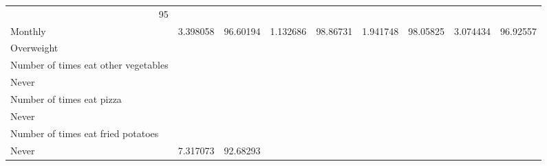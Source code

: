 \documentclass{article}
\begin{document}
\begin{tabular}{lllllllll}
  \multicolumn{1}{r}{95} \\
\multicolumn{1}{l}{\hspace{7em}Monthly} &
  \multicolumn{1}{|r}{3.398058} &
  \multicolumn{1}{r}{96.60194} &
  \multicolumn{1}{r}{1.132686} &
  \multicolumn{1}{r}{98.86731} &
  \multicolumn{1}{r}{1.941748} &
  \multicolumn{1}{r}{98.05825} &
  \multicolumn{1}{r}{3.074434} &
  \multicolumn{1}{r}{96.92557} \\
\multicolumn{1}{l}{\hspace{1em}Overweight} &
  \multicolumn{1}{|r}{} &
  \multicolumn{1}{r}{} &
  \multicolumn{1}{r}{} &
  \multicolumn{1}{r}{} &
  \multicolumn{1}{r}{} &
  \multicolumn{1}{r}{} &
  \multicolumn{1}{r}{} &
  \multicolumn{1}{r}{} \\
\multicolumn{1}{l}{\hspace{2em}Number of times eat other vegetables} &
  \multicolumn{1}{|r}{} &
  \multicolumn{1}{r}{} &
  \multicolumn{1}{r}{} &
  \multicolumn{1}{r}{} &
  \multicolumn{1}{r}{} &
  \multicolumn{1}{r}{} &
  \multicolumn{1}{r}{} &
  \multicolumn{1}{r}{} \\
\multicolumn{1}{l}{\hspace{3em}Never} &
  \multicolumn{1}{|r}{} &
  \multicolumn{1}{r}{} &
  \multicolumn{1}{r}{} &
  \multicolumn{1}{r}{} &
  \multicolumn{1}{r}{} &
  \multicolumn{1}{r}{} &
  \multicolumn{1}{r}{} &
  \multicolumn{1}{r}{} \\
\multicolumn{1}{l}{\hspace{4em}Number of times eat pizza} &
  \multicolumn{1}{|r}{} &
  \multicolumn{1}{r}{} &
  \multicolumn{1}{r}{} &
  \multicolumn{1}{r}{} &
  \multicolumn{1}{r}{} &
  \multicolumn{1}{r}{} &
  \multicolumn{1}{r}{} &
  \multicolumn{1}{r}{} \\
\multicolumn{1}{l}{\hspace{5em}Never} &
  \multicolumn{1}{|r}{} &
  \multicolumn{1}{r}{} &
  \multicolumn{1}{r}{} &
  \multicolumn{1}{r}{} &
  \multicolumn{1}{r}{} &
  \multicolumn{1}{r}{} &
  \multicolumn{1}{r}{} &
  \multicolumn{1}{r}{} \\
\multicolumn{1}{l}{\hspace{6em}Number of times eat fried potatoes} &
  \multicolumn{1}{|r}{} &
  \multicolumn{1}{r}{} &
  \multicolumn{1}{r}{} &
  \multicolumn{1}{r}{} &
  \multicolumn{1}{r}{} &
  \multicolumn{1}{r}{} &
  \multicolumn{1}{r}{} &
  \multicolumn{1}{r}{} \\
\multicolumn{1}{l}{\hspace{7em}Never} &
  \multicolumn{1}{|r}{7.317073} &
  \multicolumn{1}{r}{92.68293} &

\end{tabular}
\end{document}

